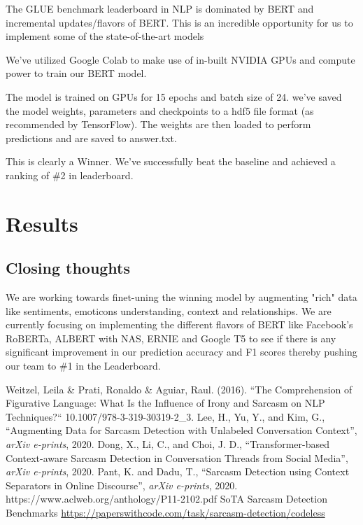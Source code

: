 \documentclass[conference]{IEEEtran}
\begin{document}
The GLUE benchmark leaderboard in NLP is dominated by BERT and incremental updates/flavors of BERT. This is an incredible opportunity for us to implement some of the state-of-the-art models 

We’ve utilized Google Colab to make use of in-built NVIDIA GPUs and compute power to train our BERT model.

The model is trained on GPUs for 15 epochs and batch size of 24. we’ve saved the model weights, parameters and checkpoints to a hdf5 file format (as recommended by TensorFlow). The weights are then loaded to perform predictions and are saved to answer.txt.

This is clearly a Winner. We’ve successfully beat the baseline and achieved a ranking of \#2 in leaderboard.

\section{Results}

\subsection{Closing thoughts}
We are working towards finet-uning the winning model by augmenting "rich" data like sentiments, emoticons understanding, context and relationships. We are currently focusing on implementing the different flavors of BERT like  Facebook’s RoBERTa, ALBERT with NAS, ERNIE and Google T5 to see if there is any significant improvement in our prediction accuracy and F1 scores thereby pushing our team to \#1 in the Leaderboard.


\begin{thebibliography}{00}
	 Weitzel, Leila \& Prati, Ronaldo \& Aguiar, Raul. (2016). ``The Comprehension of Figurative Language: What Is the Influence of Irony and Sarcasm on NLP Techniques?`` 10.1007/978-3-319-30319-2\_3. 
	 Lee, H., Yu, Y., and Kim, G., “Augmenting Data for Sarcasm Detection with Unlabeled Conversation Context”, \textit{arXiv e-prints}, 2020.
	 Dong, X., Li, C., and Choi, J. D., “Transformer-based Context-aware Sarcasm Detection in Conversation Threads from Social Media”, \textit{arXiv e-prints}, 2020.
	 Pant, K. and Dadu, T., “Sarcasm Detection using Context Separators in Online Discourse”, \textit{arXiv e-prints}, 2020.
	 https://www.aclweb.org/anthology/P11-2102.pdf
	 SoTA Sarcasm Detection Benchmarks \url{https://paperswithcode.com/task/sarcasm-detection/codeless}

\end{thebibliography}
\end{document}
